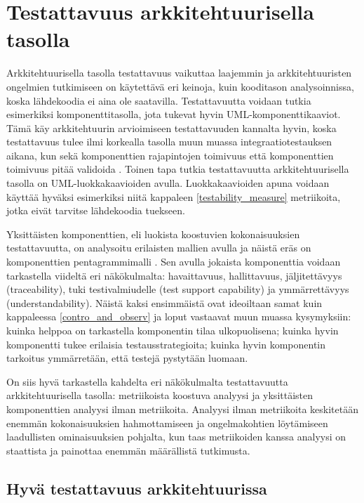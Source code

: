 \documentclass[finnish]{tktltiki2}
\numberwithin{table}{section}
\theoremstyle{definition}
\theoremstyle{remark}
\begin{document}
\section{Testattavuus arkkitehtuurisella tasolla} \label{arch_testability_main}

Arkkitehtuurisella tasolla testattavuus vaikuttaa laajemmin ja arkkitehtuuristen ongelmien tutkimiseen on käytettävä eri keinoja, kuin kooditason analysoinnissa, koska lähdekoodia ei aina ole saatavilla. Testattavuutta voidaan tutkia esimerkiksi komponenttitasolla, jota tukevat hyvin UML-komponenttikaaviot. Tämä käy arkkitehtuurin arvioimiseen testattavuuden kannalta hyvin, koska testattavuus tulee ilmi korkealla tasolla muun muassa integraatiotestauksen aikana, kun sekä komponenttien rajapintojen toimivuus että komponenttien toimivuus pitää validoida \citep[s. 65]{Eickelmann:1996:MOS:243327.243602}. Toinen tapa tutkia testattavuutta arkkitehtuurisella tasolla on UML-luokkakaavioiden avulla. Luokkakaavioiden apuna voidaan käyttää hyväksi esimerkiksi niitä kappaleen \ref{testability_measure} metriikoita, jotka eivät tarvitse lähdekoodia tuekseen. 

Yksittäisten komponenttien, eli luokista koostuvien kokonaisuuksien testattavuutta, on analysoitu erilaisten mallien avulla ja näistä eräs on komponenttien pentagrammimalli \citep{gao_component_2005}. Sen avulla jokaista komponenttia voidaan tarkastella viideltä eri näkökulmalta: havaittavuus, hallittavuus, jäljitettävyys (traceability), tuki testivalmiudelle (test support capability) ja ymmärrettävyys (understandability). Näistä kaksi ensimmäistä ovat ideoiltaan samat kuin kappaleessa \ref{contro_and_observ} ja loput vastaavat muun muassa kysymyksiin: kuinka helppoa on tarkastella komponentin tilaa ulkopuolisena; kuinka hyvin komponentti tukee erilaisia testausstrategioita; kuinka hyvin komponentin tarkoitus ymmärretään, että testejä pystytään luomaan. 
 
On siis hyvä tarkastella kahdelta eri näkökulmalta testattavuutta arkkitehtuurisella tasolla: metriikoista koostuva analyysi ja yksittäisten komponenttien analyysi ilman metriikoita. Analyysi ilman metriikoita keskitetään enemmän kokonaisuuksien hahmottamiseen ja ongelmakohtien löytämiseen laadullisten ominaisuuksien pohjalta, kun taas metriikoiden kanssa analyysi on staattista ja painottaa enemmän määrällistä tutkimusta.


\subsection{Hyvä testattavuus arkkitehtuurissa} \label{good_testability}
\end{document}

